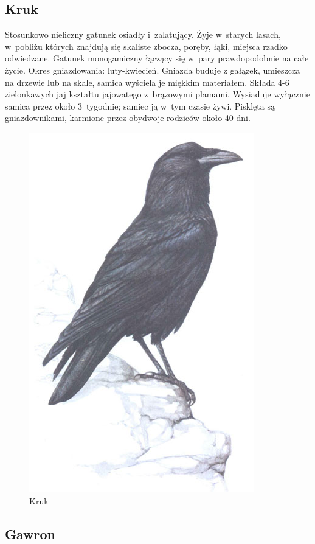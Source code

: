 \documentclass{fundam}
\begin{document}
\subsection{Kruk}

Stosunkowo nieliczny gatunek osiadły i~zalatujący. Żyje w~starych lasach, w~pobliżu których znajdują się skaliste zbocza, poręby, łąki, miejsca rzadko odwiedzane. Gatunek monogamiczny łączący się w~pary prawdopodobnie na całe życie. Okres gniazdowania: luty-kwiecień. Gniazda buduje z gałązek, umieszcza na drzewie lub na skale, samica wyściela je miękkim materiałem. Składa 4-6 zielonkawych jaj kształtu jajowatego z~brązowymi plamami. Wysiaduje wyłącznie samica przez około 3~tygodnie; samiec ją w~tym czasie żywi. Pisklęta są gniazdownikami, karmione przez obydwoje rodziców około 40 dni. 

\begin{figure}
\centerline{\includegraphics[scale=0.4]{kruk}}
\caption{Kruk}
\end{figure}

\subsection{Gawron}
\end{document}
